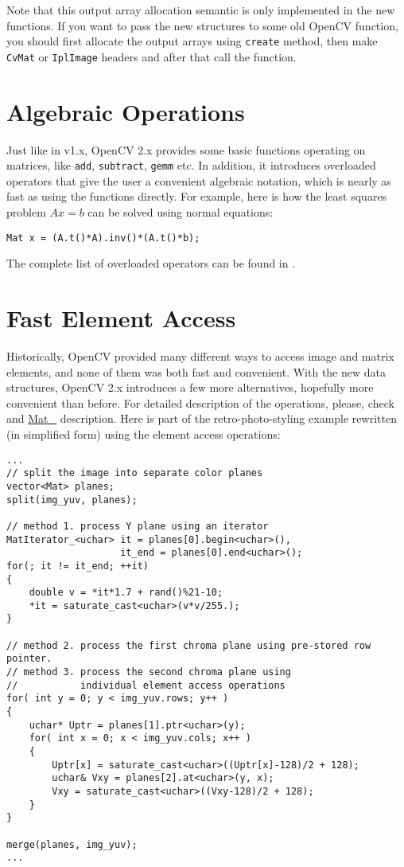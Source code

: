 Note that this output array allocation semantic is only implemented in the new functions. If you want to pass the new structures to some old OpenCV function, you should first allocate the output arrays using \texttt{create} method, then make \texttt{CvMat} or \texttt{IplImage} headers and after that call the function.

\section{Algebraic Operations}

Just like in v1.x, OpenCV 2.x provides some basic functions operating on matrices, like \texttt{add},
\texttt{subtract}, \texttt{gemm} etc. In addition, it introduces overloaded operators that give the user a convenient
algebraic notation, which is nearly as fast as using the functions directly. For example, here is how the least squares problem $Ax=b$
can be solved using normal equations:
\begin{lstlisting}
Mat x = (A.t()*A).inv()*(A.t()*b);
\end{lstlisting}

The complete list of overloaded operators can be found in .

\section{Fast Element Access}

Historically, OpenCV provided many different ways to access image and matrix elements, and none of them was both fast and convenient.
With the new data structures, OpenCV 2.x introduces a few more alternatives, hopefully more convenient than before. For detailed description of the operations, please, check  and \hyperref[MatT]{Mat\_} description. Here is part of the retro-photo-styling example rewritten (in simplified form) using the element access operations:

\begin{lstlisting}
...
// split the image into separate color planes
vector<Mat> planes;
split(img_yuv, planes);

// method 1. process Y plane using an iterator
MatIterator_<uchar> it = planes[0].begin<uchar>(),
                    it_end = planes[0].end<uchar>();
for(; it != it_end; ++it)
{
    double v = *it*1.7 + rand()%21-10;
    *it = saturate_cast<uchar>(v*v/255.);
}

// method 2. process the first chroma plane using pre-stored row pointer.
// method 3. process the second chroma plane using
//           individual element access operations
for( int y = 0; y < img_yuv.rows; y++ )
{
    uchar* Uptr = planes[1].ptr<uchar>(y);
    for( int x = 0; x < img_yuv.cols; x++ )
    {
        Uptr[x] = saturate_cast<uchar>((Uptr[x]-128)/2 + 128);
        uchar& Vxy = planes[2].at<uchar>(y, x);
        Vxy = saturate_cast<uchar>((Vxy-128)/2 + 128);
    }
}

merge(planes, img_yuv);
...
\end{lstlisting}


